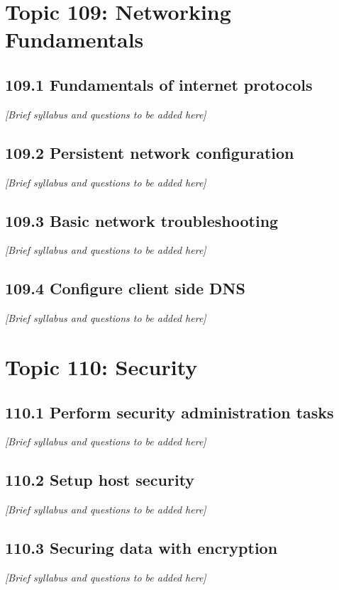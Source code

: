 \documentclass[12pt,a4paper]{report}
\begin{document}
\chapter{Topic 109: Networking Fundamentals}
\section{109.1 Fundamentals of internet protocols}
\textit{[Brief syllabus and questions to be added here]}

\section{109.2 Persistent network configuration}
\textit{[Brief syllabus and questions to be added here]}

\section{109.3 Basic network troubleshooting}
\textit{[Brief syllabus and questions to be added here]}

\section{109.4 Configure client side DNS}
\textit{[Brief syllabus and questions to be added here]}

\chapter{Topic 110: Security}
\section{110.1 Perform security administration tasks}
\textit{[Brief syllabus and questions to be added here]}

\section{110.2 Setup host security}
\textit{[Brief syllabus and questions to be added here]}

\section{110.3 Securing data with encryption}
\textit{[Brief syllabus and questions to be added here]}
\end{document}
